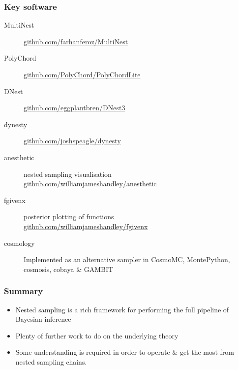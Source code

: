 \documentclass[%
]{beamer}
\begin{document}

\begin{frame}
    \frametitle{Key software}
    \begin{description}
        \item[MultiNest] \url{github.com/farhanferoz/MultiNest}
        \item[PolyChord] \url{github.com/PolyChord/PolyChordLite}
        \item[DNest] \url{github.com/eggplantbren/DNest3}
        \item[dynesty] \url{github.com/joshspeagle/dynesty}
        \item[anesthetic] nested sampling visualisation \\ \url{github.com/williamjameshandley/anesthetic}
        \item[fgivenx] posterior plotting of functions \\ \url{github.com/williamjameshandley/fgivenx}
        \item[cosmology] Implemented as an alternative sampler in CosmoMC, MontePython, cosmosis, cobaya \& GAMBIT
    \end{description}
\end{frame}

\begin{frame}
    \frametitle{Summary}
    \begin{itemize}
        \item Nested sampling is a rich framework for performing the full pipeline of Bayesian inference
        \item Plenty of further work to do on the underlying theory
        \item Some understanding is required in order to operate \& get the most from nested sampling chains.
    \end{itemize}
\end{frame}


\end{document}
